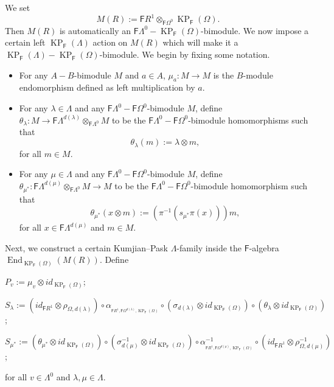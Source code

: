 \documentclass[12pt]{amsart}
\newcommand{\KP}{\operatorname{KP}}
\theoremstyle{definition}
\theoremstyle{remark}
\newcommand{\End}{\operatorname{End}}
\begin{document}
We set \[M(R):=\mathsf{F}R^1\otimes_{\mathsf{F}\Omega^0}\KP_\mathsf{F}(\Omega).\] Then $M(R)$ is automatically an $\mathsf{F}\Lambda^0-\KP_\mathsf{F}(\Omega)$-bimodule. We now impose a certain left $\KP_\mathsf{F}(\Lambda)$ action on $M(R)$ which will make it a $\KP_\mathsf{F}(\Lambda)-\KP_\mathsf{F}(\Omega)$-bimodule. We begin by fixing some notation. 
\begin{itemize}
    \item For any $A-B$-bimodule $M$ and $a\in A$, $\mu_a:M\longrightarrow M$ is the $B$-module endomorphism defined as left multiplication by $a$. 

    \item For any $\lambda\in \Lambda$ and any $\mathsf{F}\Lambda^0-\mathsf{F}\Omega^0$-bimodule $M$, define $\theta_\lambda:M\longrightarrow \mathsf{F}\Lambda^{d(\lambda)}\otimes_{\mathsf{F}\Lambda^0}M$ to be the $\mathsf{F}\Lambda^0-\mathsf{F}\Omega^0$-bimodule homomorphisms such that \[\theta_\lambda(m):=\lambda\otimes m,\] for all $m\in M$.

    \item For any $\mu\in \Lambda$ and any $\mathsf{F}\Lambda^0-\mathsf{F}\Omega^0$-bimodule $M$, define $\theta_{\mu^*}:\mathsf{F}\Lambda^{d(\mu)}\otimes_{\mathsf{F}\Lambda^0}M\longrightarrow M$ to be the $\mathsf{F}\Lambda^0-\mathsf{F}\Omega^0$-bimodule homomorphism such that \[\theta_{\mu^*}(x\otimes m):=\left(\pi^{-1}(s_{\mu^*}\pi(x))\right)m,\] for all $x\in \mathsf{F}\Lambda^{d(\mu)}$ and $m\in M$. 
\end{itemize}
Next, we construct a certain Kumjian--Pask $\Lambda$-family inside the $\mathsf{F}$-algebra $\End_{\KP_\mathsf{F}(\Omega)}(M(R))$. Define
\begin{center}
    $P_v:=\mu_v\otimes id_{\KP_\mathsf{F}(\Omega)}$;

    $S_\lambda:=\left(id_{\mathsf{F}R^1}\otimes \rho_{\Omega,d(\lambda)}\right)\circ \alpha_{_{\mathsf{F}R^1,\mathsf{F}\Omega^{d(\lambda)},\KP_\mathsf{F}(\Omega)}}\circ \left(\sigma_{d(\lambda)}\otimes id_{\KP_\mathsf{F}(\Omega)}\right)\circ \left(\theta_\lambda\otimes id_{\KP_\mathsf{F}(\Omega)}\right)$;

    $S_{\mu^*}:=\left(\theta_{\mu^*}\otimes id_{\KP_\mathsf{F}(\Omega)}\right)\circ \left(\sigma_{d(\mu)}^{-1}\otimes id_{\KP_\mathsf{F}(\Omega)}\right)\circ \alpha_{_{\mathsf{F}R^1,\mathsf{F}\Omega^{d(\mu)},\KP_\mathsf{F}(\Omega)}}^{-1}\circ \left(id_{\mathsf{F}R^1}\otimes\rho_{\Omega,d(\mu)}^{-1}\right)$;
\end{center}
for all $v\in \Lambda^0$ and $\lambda,\mu\in \Lambda$. 
\end{document}
